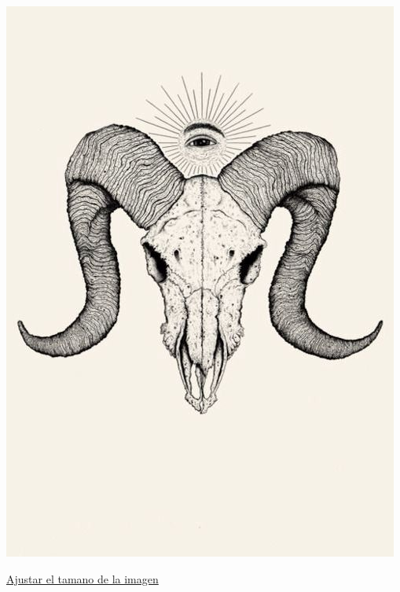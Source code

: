 \documentclass[]{article} %
\begin{document}
        \includegraphics{dd70b1b87d300d20fcfaf566f13de977.jpg}

        \underline{Ajustar el tamano de la imagen}
\end{document}

